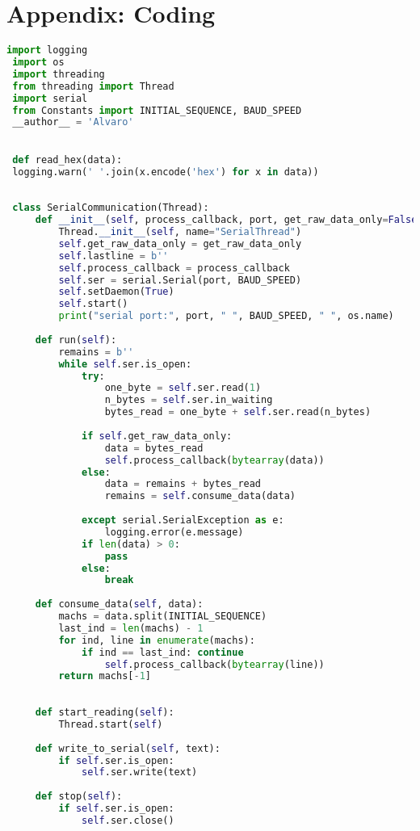 \documentclass[hidelinks,11pt,a4paper,oneside,article]{memoir}
\begin{document}
\chapter{Appendix: Coding}\label{appx:first}

 \begin{lstlisting}[label={listing:serialcommunication},caption={Class to get serial data from the cameras},language=Python, style=styleprogramming]
 import logging
 import os
 import threading
 from threading import Thread
 import serial
 from Constants import INITIAL_SEQUENCE, BAUD_SPEED
 __author__ = 'Alvaro'
 

 def read_hex(data):
 logging.warn(' '.join(x.encode('hex') for x in data))
 
 
 class SerialCommunication(Thread):
     def __init__(self, process_callback, port, get_raw_data_only=False):
         Thread.__init__(self, name="SerialThread")
         self.get_raw_data_only = get_raw_data_only
         self.lastline = b''
         self.process_callback = process_callback
         self.ser = serial.Serial(port, BAUD_SPEED)
         self.setDaemon(True)
         self.start()
         print("serial port:", port, " ", BAUD_SPEED, " ", os.name)
     
     def run(self):
         remains = b''
         while self.ser.is_open:
             try:
                 one_byte = self.ser.read(1) 
                 n_bytes = self.ser.in_waiting
                 bytes_read = one_byte + self.ser.read(n_bytes)
     
             if self.get_raw_data_only:
                 data = bytes_read
                 self.process_callback(bytearray(data))
             else:
                 data = remains + bytes_read
                 remains = self.consume_data(data)
     
             except serial.SerialException as e:
                 logging.error(e.message)
             if len(data) > 0:
                 pass
             else:
                 break
     
     def consume_data(self, data):
         machs = data.split(INITIAL_SEQUENCE)
         last_ind = len(machs) - 1
         for ind, line in enumerate(machs):
             if ind == last_ind: continue
                 self.process_callback(bytearray(line))
         return machs[-1]
     
     
     def start_reading(self):
         Thread.start(self)
     
     def write_to_serial(self, text):
         if self.ser.is_open:
             self.ser.write(text)
     
     def stop(self):
         if self.ser.is_open:
             self.ser.close()
 
 \end{lstlisting}
\end{document}
